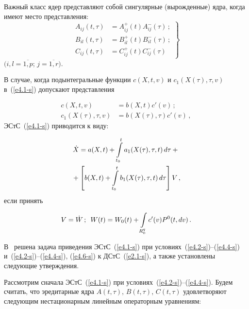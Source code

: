 \begin{multicols}{2}
Важный класс ядер представляют собой сингулярные (вырожденные) ядра,
когда имеют место представления:
\begin{equation}
\left.
\begin{array}{rl}
A_{ij} (t,\tau) &= A_{ij}^+(t) A_{ij}^-(\tau)\,;\\[9pt]
    B_{i l} (t,\tau) &= B_{il}^+(t) B_{il}^-(\tau)\,;\\[9pt]
    C_{ij} (t,\tau) &= C_{ij}^+ ( t) C_{ij}^- (\tau)
    \end{array}
    \right\}
    \label{e4.6-s}
    \end{equation}
$(i,l= \overline{1,p}$; $j=\overline{1,r}).$

В случае, когда подынтегральные функции  $c(X, t, v)$ и  $c_1(X(\tau), \tau, v)$
в~(\ref{e4.1-s}) допускают пред\-став\-ле\-ния

\noindent
    \begin{align*}
    c(X,t, v)&=b(X, t)c'(v)\,;\\
    c_1(X(\tau), \tau, v)&=b(X(\tau),\tau)c'(v)\,,
    \end{align*}
ЭСтС~(\ref{e4.1-s}) приводится к виду:

\noindent
\begin{multline}
\dot X =  a(X, t)+\int\limits_{t_0}^t a_1 (X(\tau),\tau, t)\,d\tau
    +{}\\
    {}+\left[ b(X, t)+ \int\limits_{t_0}^t b_1 (X(\tau),\tau, t)\,d\tau\right] V\,,
    \label{e4.8-s}
    \end{multline}
если принять

\noindent
    $$
    V=\dot W\,;\enskip W(t) = W_0(t) +\int\limits_{R_0^q} c' (v) P^0 (t, dv)\,.$$

В~\cite{21-s} решена задача приведения ЭСтС~(\ref{e4.1-s}) при
условиях~(\ref{e4.2-s})--(\ref{e4.4-s})
и~(\ref{e4.2-s})--(\ref{e4.4-s}), (\ref{e4.6-s}) к ДСтС~(\ref{e2.1-s}),
а также установлены следующие утверждения.

Рассмотрим сначала ЭСтС~(\ref{e4.1-s}) при условиях~(\ref{e4.2-s})--(\ref{e4.4-s}).
Будем считать, что эредитарные ядра  $A(t,\tau)$, $B(t,\tau)$, $C(t,\tau)$
удовлетворяют следующим нестационарным линейным операторным уравнениям:


\end{multicols}
